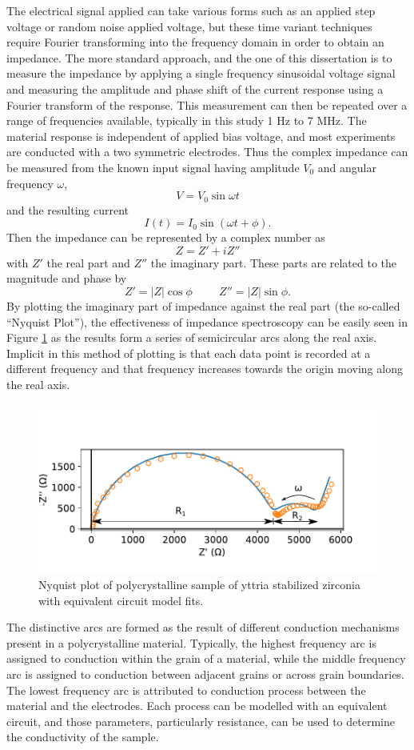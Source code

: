  The electrical signal applied can take various forms such as an applied step voltage or random noise applied voltage, but these time variant techniques require Fourier transforming into the frequency domain in order to obtain an impedance. The more standard approach, and the one of this dissertation is to measure the impedance by applying a single frequency sinusoidal voltage signal and measuring the amplitude and phase shift of the current response using a Fourier transform of the response. This measurement can then be repeated over a range of frequencies available, typically in this study 1 Hz to 7 MHz. The material response is independent of applied bias voltage, and most experiments are conducted with a two symmetric electrodes. Thus the complex impedance can be measured from the known input signal having amplitude $V_0$ and angular frequency $\omega$, \[V = V_0\sin{\omega t}\] and the resulting current \[I(t) = I_0 \sin(\omega t + \phi).\] Then the impedance can be represented by a complex number as \[Z = Z' + i Z''\] with $Z'$ the real part and $Z''$ the imaginary part. These parts are related to the magnitude and phase by \[Z'=|Z|\cos{\phi} \hspace{1cm} Z''=|Z|\sin{\phi}.\] By plotting the imaginary part of impedance against the real part (the so-called ``Nyquist Plot''), the effectiveness of impedance spectroscopy can be easily seen in Figure \ref{meth:fig:eis:nyquist:ysz} as the results form a series of semicircular arcs along the real axis. Implicit in this method of plotting is that each data point is recorded at a different frequency and that frequency increases towards the origin moving along the real axis. 
\begin{figure}
    \centering
    \includegraphics{Figures/190603-YSZ-nyquist-and-fit-edit.pdf}
    \caption{Nyquist plot of polycrystalline sample of yttria stabilized zirconia with equivalent circuit model fits.}
    \label{meth:fig:eis:nyquist:ysz}
\end{figure}
The distinctive arcs are formed as the result of different conduction mechanisms present in a polycrystalline material. Typically, the highest frequency arc is assigned to conduction within the grain of a material, while the middle frequency arc is assigned to conduction between adjacent grains or across grain boundaries. The lowest frequency arc is attributed to conduction process between the material and the electrodes. Each process can be modelled with an equivalent circuit, and those parameters, particularly resistance, can be used to determine the conductivity of the sample.

